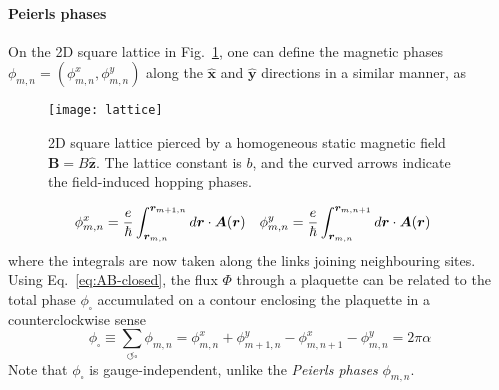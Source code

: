 \paragraph{Peierls phases}
On the 2D square lattice in Fig.~\ref{fig:hh-lattice}, one can define
the magnetic phases
$\phi_{m,n} = \left(\phi^{x}_{m,n},\phi^{y}_{m,n}\right)$ along the
$\hat{\bm{x}}$ and $\hat{\bm{y}}$ directions in a similar manner, as
%
\begin{figure}[tb]\centering
  \texttt{[image: lattice]}
  \caption{
    2D square lattice pierced by a homogeneous static magnetic field
    $\bm{B} = B\hat{\bm{z}}$. The lattice constant is $b$, and the curved
    arrows indicate the field-induced hopping phases.
  }\label{fig:hh-lattice}
\end{figure}
%
\begin{align}
  \phi^{x}_{m,n} &= \frac{e}{\hbar}\int_{{\bm{r}}_{m,n}}^{{\bm{r}}_{m+1,n}} d\bm{r} \cdot \bm{A}(\bm{r}) &
  \phi^{y}_{m,n} &= \frac{e}{\hbar}\int_{{\bm{r}}_{m,n}}^{{\bm{r}}_{m,n+1}} d\bm{r} \cdot \bm{A}(\bm{r})
\end{align}
where the integrals are now taken along the links joining neighbouring
sites. Using Eq.~\eqref{eq:AB-closed}, the flux $\Phi$ through a
plaquette can be related to the total phase $\phi_{\square}$
accumulated on a contour enclosing the plaquette in a counterclockwise
sense
%
\begin{equation}\label{eq:lattice-curl}
  \phi_{\square} \equiv \sum_{\circlearrowleft
    \square} \phi_{m,n} =  \phi^x_{m,n} + \phi^y_{m+1,n} - \phi^x_{m,n+1} - \phi^y_{m,n} = 2\pi \alpha 
\end{equation}
% 
Note that $\phi_{\square}$ is gauge-independent, unlike the
\textit{Peierls phases} $\phi_{m,n}$.




